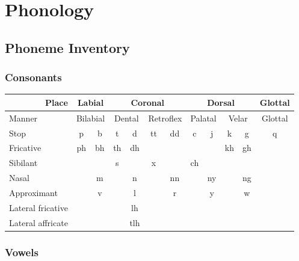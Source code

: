 \documentclass[11pt,a4paper,titlepage]{article}
\begin{document}
	\section{Phonology}

		\subsection{Phoneme Inventory}

			\subsubsection{Consonants}
        \begin{tabular}{|l|cc|cc|cc|cc|cc|cc|}

          \hline
          \multicolumn{1}{|r}{Place} & \multicolumn{2}{|c}{Labial} & \multicolumn{4}{|c}{Coronal} & \multicolumn{4}{|c}{Dorsal} & \multicolumn{2}{|c|}{Glottal} \\

          \hline
          Manner & \multicolumn{2}{c}{Bilabial} & \multicolumn{2}{|c}{Dental} & \multicolumn{2}{|c}{Retroflex} & \multicolumn{2}{|c}{Palatal} & \multicolumn{2}{|c}{Velar} & \multicolumn{2}{|c|}{Glottal} \\
          \hline
          Stop & p & b & t & d & tt & dd & c & j & k & g & \multicolumn{2}{c|}{q} \\
          \hline
          Fricative & ph & bh & th & dh & & & & & kh & gh & & \\
          \hline
          Sibilant & & & s & & x & & ch & & & & & \\
          \hline
          Nasal & & m & & n & & nn & & ny & & ng & & \\
          \hline
          Approximant & & v & & l & & r & & y & & w & & \\
          \hline
          Lateral fricative & & & & lh & & & & & & & & \\
          \hline
          Lateral affricate & & & & tlh & & & & & & & & \\
          \hline

        \end{tabular}

			\subsubsection{Vowels}
\end{document}
